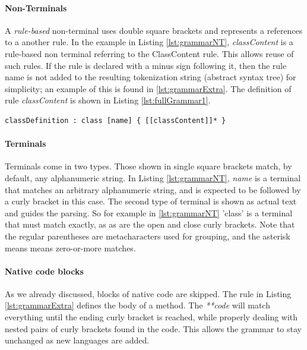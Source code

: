 
\paragraph{Non-Terminals} A \textit{rule-based} non-terminal uses double square brackets and represents a references to a another rule. In the example in Listing \ref{lst:grammarNT}, \textit{classContent} is a rule-based non terminal referring to the ClassContent rule. This allows reuse of such rules.  If the rule is declared with a minus sign following it, then the rule name is not added to the resulting tokenization string (abstract syntax tree) for simplicity; an example of this is found in \ref{lst:grammarExtra}. The definition of rule \textit{classContent} is shown in Listing \ref{lst:fullGrammar1}.


\begin{lstlisting}[language={grammar}, label=lst:grammarNT,caption=Grammar for Umple classes]
 classDefinition : class [name] { [[classContent]]* }
\end{lstlisting}

\paragraph{Terminals} Terminals come in two types. Those shown in single square brackets match, by default, any alphanumeric string. In Listing \ref{lst:grammarNT}, \textit{name} is a terminal that matches an arbitrary alphanumeric string, and is expected to be followed by a curly bracket in this case. The second type of terminal is shown as actual text and guides the parsing. So for example in \ref{lst:grammarNT} 'class' is a terminal that must match exactly, as as are the open and close curly brackets. Note that the regular parentheses are metacharacters used for grouping, and the asterisk means means zero-or-more matches.

\paragraph{Native code blocks}
As we already discussed, blocks of native code are skipped. The rule in Listing \ref{lst:grammarExtra} defines the body of a method. The \textit{**code}  will match everything until the ending curly bracket is reached, while properly dealing with nested pairs of curly brackets found in the code. This allows the grammar to stay unchanged as new languages are added. 

